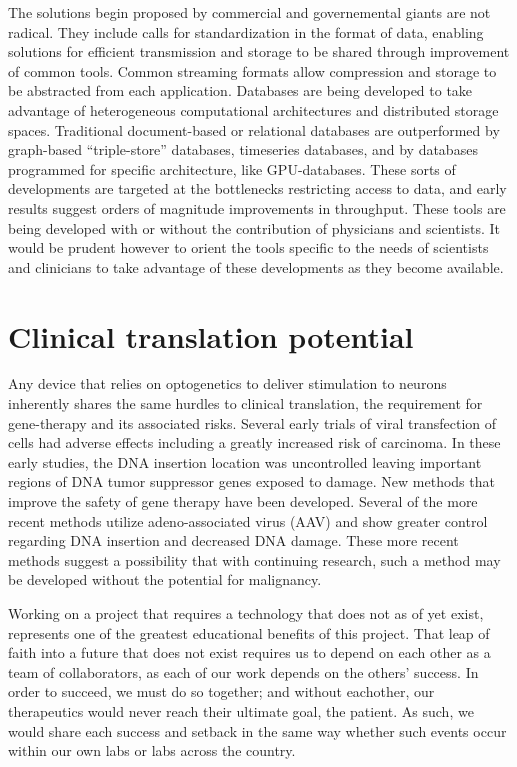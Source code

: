 \documentclass[
  12pt,
]{report}
\numberwithin{figure}{section}
\numberwithin{table}{section}
\numberwithin{equations}{section}
\begin{document}
The solutions begin proposed by commercial and governemental giants are
not radical. They include calls for standardization in the format of
data, enabling solutions for efficient transmission and storage to be
shared through improvement of common tools. Common streaming formats
allow compression and storage to be abstracted from each application.
Databases are being developed to take advantage of heterogeneous
computational architectures and distributed storage spaces. Traditional
document-based or relational databases are outperformed by graph-based
``triple-store'' databases, timeseries databases, and by databases
programmed for specific architecture, like GPU-databases. These sorts of
developments are targeted at the bottlenecks restricting access to data,
and early results suggest orders of magnitude improvements in
throughput. These tools are being developed with or without the
contribution of physicians and scientists. It would be prudent however
to orient the tools specific to the needs of scientists and clinicians
to take advantage of these developments as they become available.

\hypertarget{clinical-translation-potential}{%
\section{Clinical translation
potential}\label{clinical-translation-potential}}

Any device that relies on optogenetics to deliver stimulation to neurons
inherently shares the same hurdles to clinical translation, the
requirement for gene-therapy and its associated risks. Several early
trials of viral transfection of cells had adverse effects including a
greatly increased risk of carcinoma. In these early studies, the DNA
insertion location was uncontrolled leaving important regions of DNA
tumor suppressor genes exposed to damage. New methods that improve the
safety of gene therapy have been developed. Several of the more recent
methods utilize adeno-associated virus (AAV) and show greater control
regarding DNA insertion and decreased DNA damage. These more recent
methods suggest a possibility that with continuing research, such a
method may be developed without the potential for malignancy.

Working on a project that requires a technology that does not as of yet
exist, represents one of the greatest educational benefits of this
project. That leap of faith into a future that does not exist requires
us to depend on each other as a team of collaborators, as each of our
work depends on the others' success. In order to succeed, we must do so
together; and without eachother, our therapeutics would never reach
their ultimate goal, the patient. As such, we would share each success
and setback in the same way whether such events occur within our own
labs or labs across the country.
\end{document}
